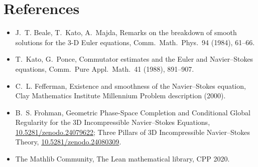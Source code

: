 \documentclass[11pt]{article}
\theoremstyle{definition}
\begin{document}


\section*{References}
\begin{itemize}
\item J.~T. Beale, T.~Kato, A.~Majda, Remarks on the breakdown of smooth solutions for
the 3-D Euler equations, Comm.\ Math.\ Phys.\ 94 (1984), 61--66.
\item T.~Kato, G.~Ponce, Commutator estimates and the Euler and Navier--Stokes equations,
Comm.\ Pure Appl.\ Math.\ 41 (1988), 891--907.
\item C.~L. Fefferman, Existence and smoothness of the Navier--Stokes equation, Clay
Mathematics Institute Millennium Problem description (2000).
\item B.~S. Frohman, Geometric Phase-Space Completion and Conditional Global Regularity for the 3D Incompressible Navier--Stokes Equations, \href{https://doi.org/10.5281/zenodo.24079622}{10.5281/zenodo.24079622};
Three Pillars of 3D Incompressible Navier--Stokes Theory, \href{https://doi.org/10.5281/zenodo.24080309}{10.5281/zenodo.24080309}.
\item The Mathlib Community, The Lean mathematical library, CPP 2020.
\end{itemize}
\end{document}
